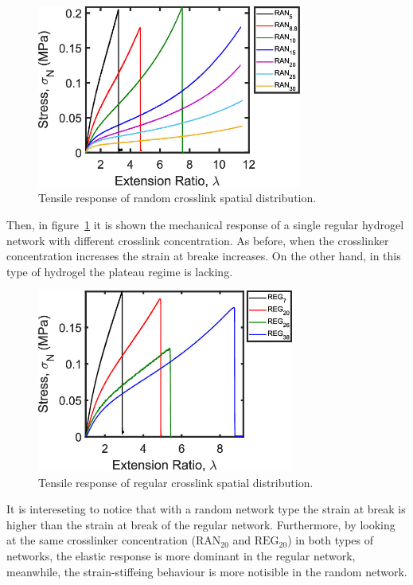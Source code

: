 \begin{figure}[ht!]
    \centering
    \includegraphics[height=6cm]{figs/explainMechResponse/singleRANtensile.jpeg}
    \caption{Tensile response of random crosslink spatial distribution\citep{kongEffectCrossLinkHomogeneity2024}.}\label{fig:RANnetworks}
\end{figure}

Then, in figure~\ref{fig:RANnetworks} it is shown the mechanical response of a single regular hydrogel network with different crosslink concentration.
As before, when the crosslinker concentration increases the strain at breake increases.
On the other hand, in this type of hydrogel the plateau regime is lacking.

\begin{figure}[ht!]
    \centering
    \includegraphics[height=6cm]{figs/explainMechResponse/singleREGtensile.jpeg}
    \caption{Tensile response of regular crosslink spatial distribution\citep{kongEffectCrossLinkHomogeneity2024}.}\label{fig:REGnetworks}
\end{figure}

It is intereseting to notice that with a random network type the strain at break is higher than the strain at break of the regular network.
Furthermore, by looking at the same crosslinker concentration ($\mathrm{RAN}_{20}$ and $\mathrm{REG}_{20}$) in both types of networks, the elastic response is more dominant in the regular network, meanwhile, the strain-stiffeing behaviour is more notisible in the random network. 

